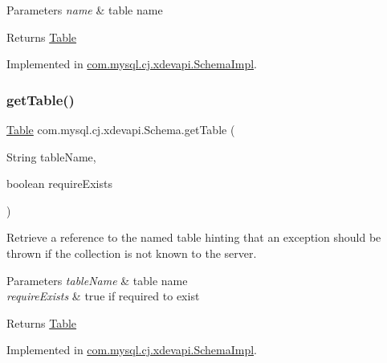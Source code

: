 \begin{DoxyParams}{Parameters}
{\em name} & table name \\
\hline
\end{DoxyParams}
\begin{DoxyReturn}{Returns}
\mbox{\hyperlink{interfacecom_1_1mysql_1_1cj_1_1xdevapi_1_1_table}{Table}} 
\end{DoxyReturn}


Implemented in \mbox{\hyperlink{classcom_1_1mysql_1_1cj_1_1xdevapi_1_1_schema_impl_a47c591b1796cbcb04985088ad3cbaad7}{com.\+mysql.\+cj.\+xdevapi.\+Schema\+Impl}}.

\mbox{\label{interfacecom_1_1mysql_1_1cj_1_1xdevapi_1_1_schema_a555b3596a60f576785190870c67f8ef5}} 
\subsubsection{\texorpdfstring{get\+Table()}{getTable()}\hspace{0.1cm}{\footnotesize\ttfamily [2/2]}}
{\footnotesize\ttfamily \mbox{\hyperlink{interfacecom_1_1mysql_1_1cj_1_1xdevapi_1_1_table}{Table}} com.\+mysql.\+cj.\+xdevapi.\+Schema.\+get\+Table (\begin{DoxyParamCaption}\item[{String}]{table\+Name,  }\item[{boolean}]{require\+Exists }\end{DoxyParamCaption})}

Retrieve a reference to the named table hinting that an exception should be thrown if the collection is not known to the server.


\begin{DoxyParams}{Parameters}
{\em table\+Name} & table name \\
\hline
{\em require\+Exists} & true if required to exist \\
\hline
\end{DoxyParams}
\begin{DoxyReturn}{Returns}
\mbox{\hyperlink{interfacecom_1_1mysql_1_1cj_1_1xdevapi_1_1_table}{Table}} 
\end{DoxyReturn}


Implemented in \mbox{\hyperlink{classcom_1_1mysql_1_1cj_1_1xdevapi_1_1_schema_impl_a6bef049505f3d49b68e56fb2169dc165}{com.\+mysql.\+cj.\+xdevapi.\+Schema\+Impl}}.

